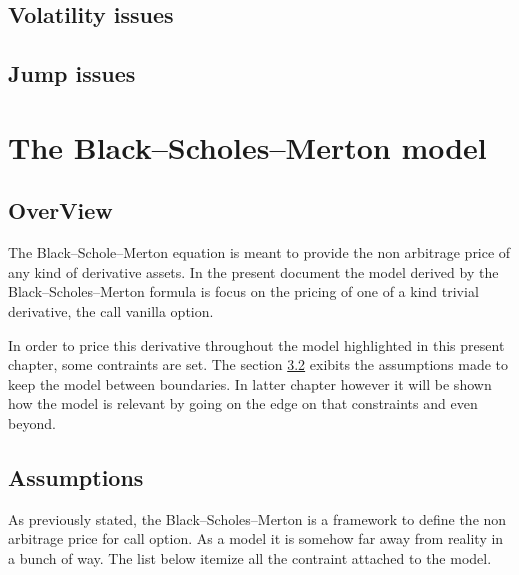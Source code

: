 \documentclass[12pt]{report}
\newcommand{\BSM}{Black--Scholes--Merton }
\begin{document}
\section{Volatility issues}
\label{sec:Volatility issues}



\section{Jump issues}
\label{sec:Jump issues}
%
%
\chapter{The \BSM model}
\label{cha:The \BSM model}


\section{OverView}
\label{sec:OverView}

The Black--Schole--Merton equation is meant to provide the non arbitrage price of any kind of derivative assets. In the present document the model derived by the Black--Scholes--Merton formula is focus on the pricing of one of a kind trivial derivative, the call vanilla option.

In order to price this derivative throughout the model highlighted in this present chapter, some contraints are set. The section \ref{sec:Assumptions} exibits the assumptions made to keep the model between boundaries. In latter chapter however it will be shown how the model is relevant by going on the edge on that constraints and even beyond.


\section{Assumptions}
\label{sec:Assumptions}

As previously stated, the Black--Scholes--Merton is a framework to define the non arbitrage price for call option. As a model it is somehow far away from reality in a bunch of way. The list below itemize all the contraint attached to the model.
\end{document}

